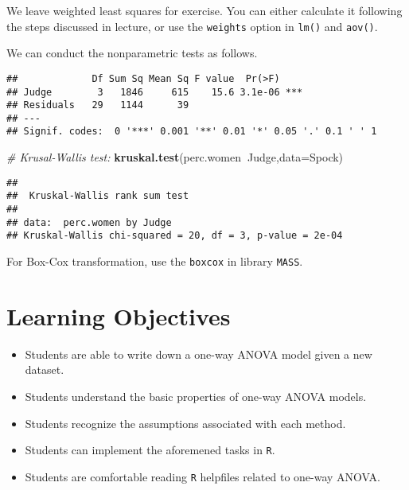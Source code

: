 \documentclass[12pt,]{book}
\newenvironment{Shaded}{\begin{snugshade}}{\end{snugshade}}
\newcommand{\KeywordTok}[1]{\textcolor[rgb]{0.13,0.29,0.53}{\textbf{#1}}}
\newcommand{\DataTypeTok}[1]{\textcolor[rgb]{0.13,0.29,0.53}{#1}}
\newcommand{\CommentTok}[1]{\textcolor[rgb]{0.56,0.35,0.01}{\textit{#1}}}
\newcommand{\OperatorTok}[1]{\textcolor[rgb]{0.81,0.36,0.00}{\textbf{#1}}}
\newcommand{\NormalTok}[1]{#1}
\providecommand{\tightlist}{%
  \setlength{\itemsep}{0pt}\setlength{\parskip}{0pt}}
\begin{document}
We leave weighted least squares for exercise. You can either calculate
it following the steps discussed in lecture, or use the \texttt{weights}
option in \texttt{lm()} and \texttt{aov()}.

We can conduct the nonparametric tests as follows.

\begin{Shaded}
\end{Shaded}

\begin{verbatim}
##             Df Sum Sq Mean Sq F value  Pr(>F)    
## Judge        3   1846     615    15.6 3.1e-06 ***
## Residuals   29   1144      39                    
## ---
## Signif. codes:  0 '***' 0.001 '**' 0.01 '*' 0.05 '.' 0.1 ' ' 1
\end{verbatim}

\begin{Shaded}
\begin{Highlighting}[]
\CommentTok{# Krusal-Wallis test:}
\KeywordTok{kruskal.test}\NormalTok{(perc.women}\OperatorTok{~}\NormalTok{Judge,}\DataTypeTok{data=}\NormalTok{Spock)}
\end{Highlighting}
\end{Shaded}

\begin{verbatim}
## 
##  Kruskal-Wallis rank sum test
## 
## data:  perc.women by Judge
## Kruskal-Wallis chi-squared = 20, df = 3, p-value = 2e-04
\end{verbatim}

For Box-Cox transformation, use the \texttt{boxcox} in library
\texttt{MASS}.

\section{Learning Objectives}\label{learning-objectives-1}

\begin{itemize}
\tightlist
\item
  Students are able to write down a one-way ANOVA model given a new
  dataset.
\item
  Students understand the basic properties of one-way ANOVA models.
\item
  Students recognize the assumptions associated with each method.
\item
  Students can implement the aforemened tasks in \texttt{R}.
\item
  Students are comfortable reading \texttt{R} helpfiles related to
  one-way ANOVA.
\end{itemize}
\end{document}
